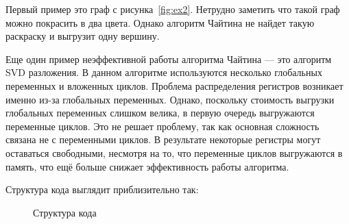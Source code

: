 Первый пример это граф с рисунка~\ref{fig:ex2}. Нетрудно заметить что такой граф можно покрасить в два цвета.
Однако алгоритм Чайтина не найдет такую раскраску и выгрузит одну вершину.

\begin{figure}[H]
    \centering
\end{figure} %

Еще один пример неэффективной работы алгоритма Чайтина — это алгоритм SVD разложения.
В данном алгоритме используются несколько глобальных переменных и вложенных циклов.
Проблема распределения регистров возникает именно из-за глобальных переменных.  
Однако, поскольку стоимость выгрузки глобальных переменных слишком велика, в первую очередь выгружаются переменные циклов.
Это не решает проблему, так как основная сложность связана не с переменными циклов. 
В результате некоторые регистры могут оставаться свободными, несмотря на то, что переменные циклов выгружаются в память, что ещё больше снижает эффективность работы алгоритма.

Структура кода выглядит приблизительно так:

\begin{figure}[H]
    \centering
    \caption{Структура кода}
    \label{fig:structure}
\end{figure}

